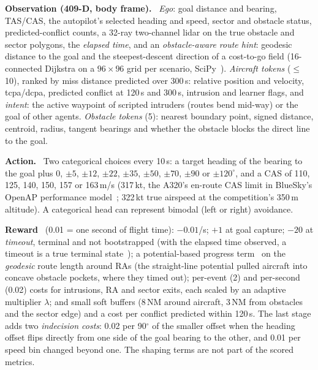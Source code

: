 \documentclass[10pt,twocolumn]{article}
\renewcommand{\paragraph}[1]{\par\smallskip\noindent\textbf{#1}\ }
\begin{document}
\paragraph{Observation (409-D, body frame).} \emph{Ego}: goal distance and
bearing, TAS/CAS, the autopilot's selected heading and speed, sector and
obstacle status, predicted-conflict counts, a 32-ray two-channel lidar on the
true obstacle and sector polygons, the \emph{elapsed time}, and an
\emph{obstacle-aware route hint}: geodesic distance to the goal and the
steepest-descent direction of a cost-to-go field (16-connected Dijkstra on a
$96\times96$ grid per scenario, SciPy~\citep{virtanen2020scipy}). \emph{Aircraft tokens} ($\le$10),
ranked by miss distance predicted over 300\,s: relative position and velocity,
tcpa/dcpa, predicted conflict at 120\,s and 300\,s, intrusion and learner flags,
and \emph{intent}: the active waypoint of scripted intruders (routes bend
mid-way) or the goal of other agents. \emph{Obstacle tokens} (5): nearest
boundary point, signed distance, centroid, radius, tangent bearings and
whether the obstacle blocks the direct line to the goal.

\paragraph{Action.} Two categorical choices every 10\,s: a target heading of
the bearing to the goal plus $0$, $\pm5$, $\pm12$, $\pm22$, $\pm35$, $\pm50$,
$\pm70$, $\pm90$ or $\pm120^\circ$, and a CAS of
110, 125, 140, 150, 157 or 163\,m/s (317\,kt, the A320's en-route CAS limit in
BlueSky's OpenAP performance model~\citep{sun2020openap}; 322\,kt true airspeed
at the competition's 350\,m altitude). A
categorical head can represent bimodal (left or right) avoidance.

\paragraph{Reward} (0.01 = one second of flight time): $-0.01$/s; $+1$ at goal
capture; $-20$ at \emph{timeout}, terminal and not bootstrapped (with the
elapsed time observed, a timeout is a true terminal
state~\citep{pardo2018time}); a potential-based
progress term~\citep{ng1999policy} on the \emph{geodesic} route length around
RAs (the straight-line potential pulled aircraft into concave obstacle pockets,
where they timed out); per-event (2) and per-second (0.02) costs for intrusions,
RA and sector exits, each scaled by an adaptive multiplier $\lambda$; and small
soft buffers (8\,NM around aircraft, 3\,NM from obstacles and the sector edge)
and a cost per conflict predicted within 120\,s. The last stage adds two
\emph{indecision costs}: 0.02 per 90$^\circ$ of the smaller offset when the
heading offset flips directly from one side of the goal bearing to the other, and 0.01 per speed bin changed beyond one. The shaping terms are
not part of the scored metrics.
\end{document}
